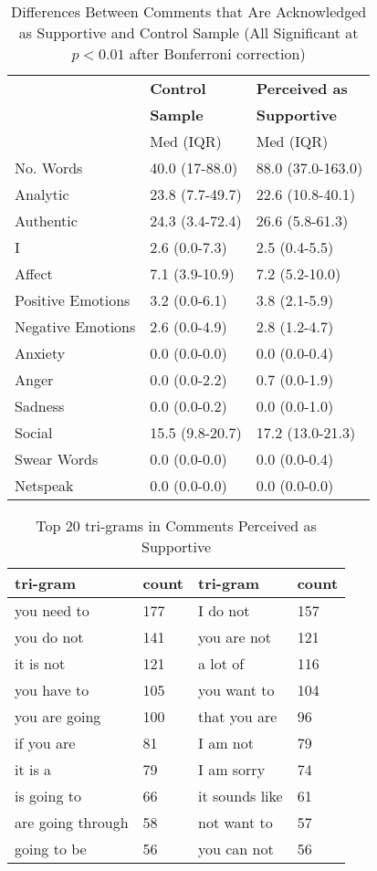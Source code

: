 \begin{table}
\caption{Differences Between Comments that Are Acknowledged as Supportive and Control Sample (All Significant at $p<0.01$ after Bonferroni correction) }
\small
\label{tab:appcommentLiwc}
\begin{tabular}{l|l|l}
\hline
 & \textbf{Control} & \textbf{Perceived as}\\
 & \textbf{Sample} & \textbf{Supportive}\\
 & Med (IQR) & Med (IQR) \\
 \hline
No. Words & 40.0 (17-88.0) & 88.0 (37.0-163.0) \\
Analytic & 23.8 (7.7-49.7) & 22.6 (10.8-40.1) \\
Authentic & 24.3 (3.4-72.4) & 26.6 (5.8-61.3) \\
I & 2.6 (0.0-7.3) & 2.5 (0.4-5.5) \\
Affect & 7.1 (3.9-10.9) & 7.2 (5.2-10.0) \\
Positive Emotions & 3.2 (0.0-6.1) & 3.8 (2.1-5.9) \\
Negative Emotions & 2.6 (0.0-4.9) & 2.8 (1.2-4.7) \\
Anxiety & 0.0 (0.0-0.0) & 0.0 (0.0-0.4) \\
Anger & 0.0 (0.0-2.2) & 0.7 (0.0-1.9) \\
Sadness & 0.0 (0.0-0.2) & 0.0 (0.0-1.0) \\
Social & 15.5 (9.8-20.7) & 17.2 (13.0-21.3) \\
Swear Words & 0.0 (0.0-0.0) & 0.0 (0.0-0.4) \\
Netspeak & 0.0 (0.0-0.0) & 0.0 (0.0-0.0) 
\end{tabular}
\end{table}

\begin{table}
 \caption{Top 20 tri-grams in Comments Perceived as Supportive \label{tab:commentNgram}}
\begin{tabular}{ll|ll}
\hline
tri-gram & count & tri-gram & count \\
\hline
you need to & 177 & I do not & 157 \\
you do not & 141 & you are not & 121 \\
it is not & 121 & a lot of & 116 \\
you have to & 105 & you want to & 104 \\
you are going & 100 & that you are & 96 \\
if you are & 81 & I am not & 79 \\
it is a & 79 & I am sorry & 74 \\
is going to & 66 & it sounds like & 61 \\
are going through & 58 & not want to & 57 \\
going to be & 56 & you can not & 56 \\
\hline
\end{tabular}
\end{table}


